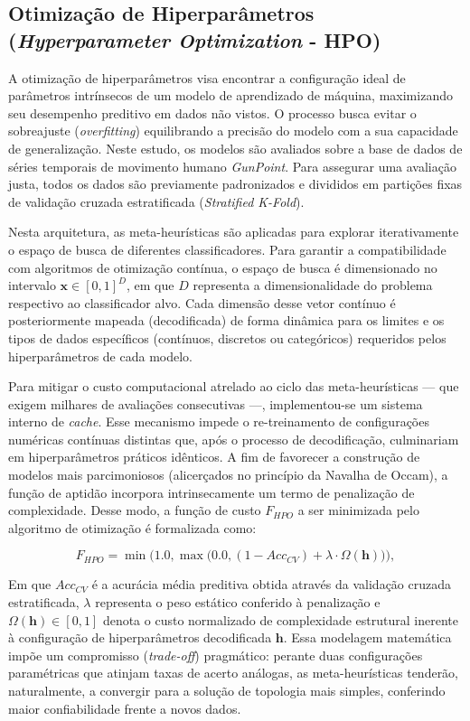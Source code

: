 \documentclass[12pt, a4paper, oneside]{report}
\begin{document}
\subsection{Otimização de Hiperparâmetros (\textit{Hyperparameter Optimization} - HPO)}

A otimização de hiperparâmetros visa encontrar a configuração ideal de parâmetros intrínsecos de um modelo de aprendizado de máquina, maximizando seu desempenho preditivo em dados não vistos. O processo busca evitar o sobreajuste (\textit{overfitting}) equilibrando a precisão do modelo com a sua capacidade de generalização. Neste estudo, os modelos são avaliados sobre a base de dados de séries temporais de movimento humano \textit{GunPoint}. Para assegurar uma avaliação justa, todos os dados são previamente padronizados e divididos em partições fixas de validação cruzada estratificada (\textit{Stratified K-Fold}).

Nesta arquitetura, as meta-heurísticas são aplicadas para explorar iterativamente o espaço de busca de diferentes classificadores. Para garantir a compatibilidade com algoritmos de otimização contínua, o espaço de busca é dimensionado no intervalo $\mathbf{x} \in [0,1]^D$, em que $D$ representa a dimensionalidade do problema respectivo ao classificador alvo. Cada dimensão desse vetor contínuo é posteriormente mapeada (decodificada) de forma dinâmica para os limites e os tipos de dados específicos (contínuos, discretos ou categóricos) requeridos pelos hiperparâmetros de cada modelo.

Para mitigar o custo computacional atrelado ao ciclo das meta-heurísticas — que exigem milhares de avaliações consecutivas —, implementou-se um sistema interno de \textit{cache}. Esse mecanismo impede o re-treinamento de configurações numéricas contínuas distintas que, após o processo de decodificação, culminariam em hiperparâmetros práticos idênticos.
A fim de favorecer a construção de modelos mais parcimoniosos (alicerçados no princípio da Navalha de Occam), a função de aptidão incorpora intrinsecamente um termo de penalização de complexidade. Desse modo, a função de custo $F_{HPO}$ a ser minimizada pelo algoritmo de otimização é formalizada como:

\begin{equation} 
F_{HPO} = \min\Big(1.0, \max\big(0.0, (1 - Acc_{CV}) + \lambda \cdot \Omega(\mathbf{h})\big)\Big), 
\end{equation}

Em que $Acc_{CV}$ é a acurácia média preditiva obtida através da validação cruzada estratificada, $\lambda$ representa o peso estático conferido à penalização e $\Omega(\mathbf{h}) \in [0,1]$ denota o custo normalizado de complexidade estrutural inerente à configuração de hiperparâmetros decodificada $\mathbf{h}$. Essa modelagem matemática impõe um compromisso (\textit{trade-off}) pragmático: perante duas configurações paramétricas que atinjam taxas de acerto análogas, as meta-heurísticas tenderão, naturalmente, a convergir para a solução de topologia mais simples, conferindo maior confiabilidade frente a novos dados.
\end{document}
